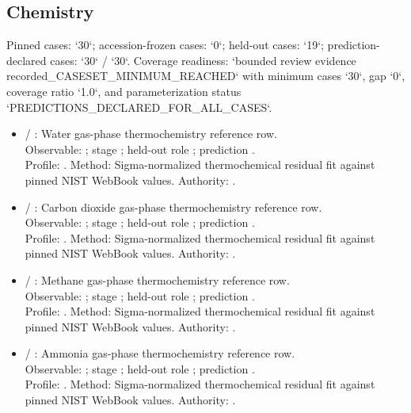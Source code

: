 \subsection{Chemistry}
Pinned cases: `30`; accession-frozen cases: `0`; held-out cases: `19`; prediction-declared cases: `30` / `30`.
Coverage readiness: `bounded review evidence recorded\_CASESET\_MINIMUM\_REACHED` with minimum cases `30`, gap `0`, coverage ratio `1.0`, and parameterization status `PREDICTIONS\_DECLARED\_FOR\_ALL\_CASES`.
\begin{itemize}
\item {} / : Water gas-phase thermochemistry reference row.\\ Observable: ; stage ; held-out role ; prediction .\\ Profile: . Method: Sigma-normalized thermochemical residual fit against pinned NIST WebBook values. Authority: .
\item {} / : Carbon dioxide gas-phase thermochemistry reference row.\\ Observable: ; stage ; held-out role ; prediction .\\ Profile: . Method: Sigma-normalized thermochemical residual fit against pinned NIST WebBook values. Authority: .
\item {} / : Methane gas-phase thermochemistry reference row.\\ Observable: ; stage ; held-out role ; prediction .\\ Profile: . Method: Sigma-normalized thermochemical residual fit against pinned NIST WebBook values. Authority: .
\item {} / : Ammonia gas-phase thermochemistry reference row.\\ Observable: ; stage ; held-out role ; prediction .\\ Profile: . Method: Sigma-normalized thermochemical residual fit against pinned NIST WebBook values. Authority: .

\end{itemize}
